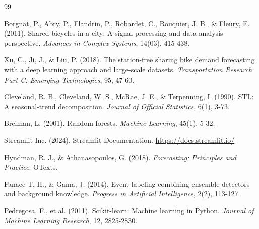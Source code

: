 \documentclass[12pt,a4paper]{article}
\begin{document}
\begin{thebibliography}{99}

Borgnat, P., Abry, P., Flandrin, P., Robardet, C., Rouquier, J. B., \& Fleury, E. (2011). Shared bicycles in a city: A signal processing and data analysis perspective. \textit{Advances in Complex Systems}, 14(03), 415-438.

Xu, C., Ji, J., \& Liu, P. (2018). The station-free sharing bike demand forecasting with a deep learning approach and large-scale datasets. \textit{Transportation Research Part C: Emerging Technologies}, 95, 47-60.

Cleveland, R. B., Cleveland, W. S., McRae, J. E., \& Terpenning, I. (1990). STL: A seasonal-trend decomposition. \textit{Journal of Official Statistics}, 6(1), 3-73.

Breiman, L. (2001). Random forests. \textit{Machine Learning}, 45(1), 5-32.

Streamlit Inc. (2024). Streamlit Documentation. \url{https://docs.streamlit.io/}

Hyndman, R. J., \& Athanasopoulos, G. (2018). \textit{Forecasting: Principles and Practice}. OTexts.

Fanaee-T, H., \& Gama, J. (2014). Event labeling combining ensemble detectors and background knowledge. \textit{Progress in Artificial Intelligence}, 2(2), 113-127.

Pedregosa, F., et al. (2011). Scikit-learn: Machine learning in Python. \textit{Journal of Machine Learning Research}, 12, 2825-2830.

\end{thebibliography}
\end{document}
